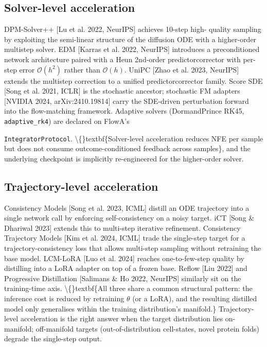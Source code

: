 \documentclass[preprint,3p,times,twocolumn]{elsarticle}
\begin{document}
\subsection{Solver-level acceleration}
DPM-Solver++ [Lu et al. 2022, NeurIPS] achieves 10-step high- quality sampling by exploiting the semi-linear structure of the diffusion ODE with a higher-order multistep solver. EDM [Karras et al. 2022, NeurIPS] introduces a preconditioned network architecture paired with a Heun 2nd-order predictorcorrector with per-step error $\mathcal{O}(h^2)$ rather than $\mathcal{O}(h)$. UniPC [Zhao et al. 2023, NeurIPS] extends the multistep correction to a unified predictorcorrector family. Score SDE [Song et al. 2021, ICLR] is the stochastic ancestor; stochastic FM adapters [NVIDIA 2024, arXiv:2410.19814] carry the SDE-driven perturbation forward into the flow-matching framework. Adaptive solvers (DormandPrince RK45, \texttt{adaptive\_rk4}) are declared on FlowA's

\texttt{IntegratorProtocol}. \textbackslash\{\}textbf\{Solver-level acceleration reduces NFE per sample but does not consume outcome-conditioned feedback across samples\}, and the underlying checkpoint is implicitly re-engineered for the higher-order solver.

\subsection{Trajectory-level acceleration}
Consistency Models [Song et al. 2023, ICML] distill an ODE trajectory into a single network call by enforcing self-consistency on a noisy target. iCT [Song \& Dhariwal 2023] extends this to multi-step iterative refinement. Consistency Trajectory Models [Kim et al. 2024, ICML] trade the single-step target for a trajectory-consistency loss that allows multi-step sampling without retraining the base model. LCM-LoRA [Luo et al. 2024] reaches one-to-few-step quality by distilling into a LoRA adapter on top of a frozen base. Reflow [Liu 2022] and Progressive Distillation [Salimans \& Ho 2022, NeurIPS] similarly sit on the training-time axis. \textbackslash\{\}textbf\{All three share a common structural pattern: the inference cost is reduced by retraining $\theta$ (or a LoRA), and the resulting distilled model only generalises within the training distribution's manifold.\} Trajectory-level acceleration is the right answer when the target distribution lies on-manifold; off-manifold targets (out-of-distribution cell-states, novel protein folds) degrade the single-step output.
\end{document}
